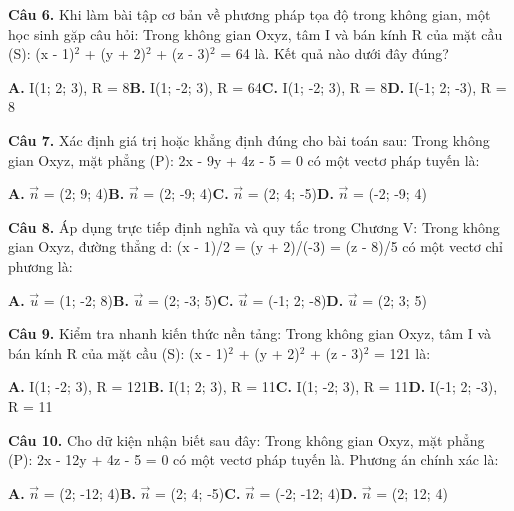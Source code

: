 \documentclass[11pt,a4paper]{article}
\begin{document}
\textbf{\color{primary} Câu 6.} Khi làm bài tập cơ bản về phương pháp tọa độ trong không gian, một học sinh gặp câu hỏi: Trong không gian Oxyz, tâm I và bán kính R của mặt cầu (S): (x - 1)$^2$ + (y + 2)$^2$ + (z - 3)$^2$ = 64 là. Kết quả nào dưới đây đúng?\par
\hspace*{1.5em}\textbf{A.} I(1; 2; 3), R = 8\quad\quad \textbf{B.} I(1; -2; 3), R = 64\quad\quad \textbf{C.} I(1; -2; 3), R = 8\quad\quad \textbf{D.} I(-1; 2; -3), R = 8\par\vspace{2pt}
\textbf{\color{primary} Câu 7.} Xác định giá trị hoặc khẳng định đúng cho bài toán sau: Trong không gian Oxyz, mặt phẳng (P): 2x - 9y + 4z - 5 = 0 có một vectơ pháp tuyến là:\par
\hspace*{1.5em}\textbf{A.} $\vec{n}$ = (2; 9; 4)\quad\quad \textbf{B.} $\vec{n}$ = (2; -9; 4)\quad\quad \textbf{C.} $\vec{n}$ = (2; 4; -5)\quad\quad \textbf{D.} $\vec{n}$ = (-2; -9; 4)\par\vspace{2pt}
\textbf{\color{primary} Câu 8.} Áp dụng trực tiếp định nghĩa và quy tắc trong Chương V: Trong không gian Oxyz, đường thẳng d: (x - 1)/2 = (y + 2)/(-3) = (z - 8)/5 có một vectơ chỉ phương là:\par
\hspace*{1.5em}\textbf{A.} $\vec{u}$ = (1; -2; 8)\quad\quad \textbf{B.} $\vec{u}$ = (2; -3; 5)\quad\quad \textbf{C.} $\vec{u}$ = (-1; 2; -8)\quad\quad \textbf{D.} $\vec{u}$ = (2; 3; 5)\par\vspace{2pt}
\textbf{\color{primary} Câu 9.} Kiểm tra nhanh kiến thức nền tảng: Trong không gian Oxyz, tâm I và bán kính R của mặt cầu (S): (x - 1)$^2$ + (y + 2)$^2$ + (z - 3)$^2$ = 121 là:\par
\hspace*{1.5em}\textbf{A.} I(1; -2; 3), R = 121\quad\quad \textbf{B.} I(1; 2; 3), R = 11\quad\quad \textbf{C.} I(1; -2; 3), R = 11\quad\quad \textbf{D.} I(-1; 2; -3), R = 11\par\vspace{2pt}
\textbf{\color{primary} Câu 10.} Cho dữ kiện nhận biết sau đây: Trong không gian Oxyz, mặt phẳng (P): 2x - 12y + 4z - 5 = 0 có một vectơ pháp tuyến là. Phương án chính xác là:\par
\hspace*{1.5em}\textbf{A.} $\vec{n}$ = (2; -12; 4)\quad\quad \textbf{B.} $\vec{n}$ = (2; 4; -5)\quad\quad \textbf{C.} $\vec{n}$ = (-2; -12; 4)\quad\quad \textbf{D.} $\vec{n}$ = (2; 12; 4)\par\vspace{2pt}
\end{document}
